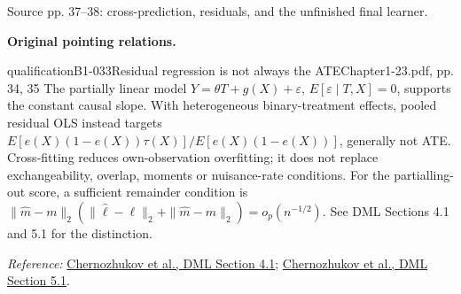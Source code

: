 {\begin{center}
\begin{tikzpicture}[>=Stealth, font=\small, line width=.65pt]
\end{tikzpicture}
\par{\small Source pp. 37--38: cross-prediction, residuals, and the unfinished final learner.}
\end{center}
\par{}\smallskip\textbf{Original pointing relations.}\par\smallskip
{}
\begin{reviewnote}{qualification}{B1-033}{Residual regression is not always the ATE}{Chapter1-23.pdf, pp. 34, 35}
The partially linear model $Y=\theta T+g(X)+\varepsilon$, $E[\varepsilon\mid T,X]=0$, supports the constant causal slope. With heterogeneous binary-treatment effects, pooled residual OLS instead targets $E[e(X)(1-e(X))\tau(X)]/E[e(X)(1-e(X))]$, generally not ATE. Cross-fitting reduces own-observation overfitting; it does not replace exchangeability, overlap, moments or nuisance-rate conditions. For the partialling-out score, a sufficient remainder condition is $\|\hat m-m\|_2(\|\hat\ell-\ell\|_2+\|\hat m-m\|_2)=o_p(n^{-1/2})$. See DML Sections 4.1 and 5.1 for the distinction.
\par\smallskip\textit{Reference:} \href{https://arxiv.org/html/1608.00060v7#S4.SS1}{Chernozhukov et al., DML Section 4.1}; \href{https://arxiv.org/html/1608.00060v7#S5.SS1}{Chernozhukov et al., DML Section 5.1}.
\end{reviewnote}

}
